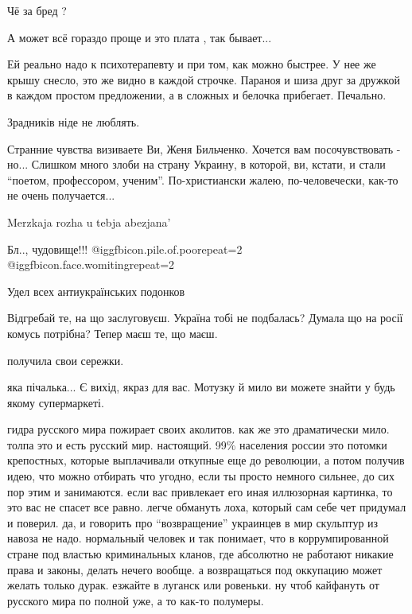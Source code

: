 \begin{itemize}
Чё за бред ?

А может всё гораздо проще и это плата , так бывает...

Ей реально надо к психотерапевту и при том, как можно быстрее. У нее же крышу снесло, это же видно в каждой строчке. Параноя и шиза друг за дружкой в каждом простом предложении, а в сложных и белочка прибегает. Печально.

Зрадників ніде не люблять.


Странние чувства визиваете Ви, Женя Бильченко. Хочется вам посочувствовать -
но... Слишком много злоби на страну Украину, в которой, ви, кстати, и стали
\enquote{поетом, профессором, ученим}. По-христиански жалею, по-человечески, как-то не
очень получается...

Merzkaja rozha u tebja abezjana'

Бл.., чудовище!!! @igg{fbicon.pile.of.poo}{repeat=2}  @igg{fbicon.face.womiting}{repeat=2} 

Удел всех антиукраїнських подонков

Відгребай те, на що заслуговуєш. Україна тобі не подбалась? Думала що на росії
комусь потрібна? Тепер маєш те, що маєш.

получила свои сережки.

яка пічалька...
Є вихід, якраз для вас.
Мотузку й мило ви можете знайти у будь якому супермаркеті.


гидра русского мира пожирает своих аколитов. как же это драматически мило.
толпа это и есть русский мир. настоящий. 99\% населения россии это потомки
крепостных, которые выплачивали откупные еще до революции, а потом получив
идею, что можно отбирать что угодно, если ты просто немного сильнее, до сих пор
этим и занимаются. если вас привлекает его иная иллюзорная картинка, то это вас
не спасет все равно. легче обмануть лоха, который сам себе чет придумал и
поверил. да, и говорить про \enquote{возвращение} украинцев в мир скульптур из навоза
не надо. нормальный человек и так понимает, что в коррумпированной стране под
властью криминальных кланов, где абсолютно не работают никакие права и законы,
делать нечего вообще. а возвращаться под оккупацию может желать только дурак.
езжайте в луганск или ровеньки. ну чтоб кайфануть от русского мира по полной
уже, а то как-то полумеры.



\end{itemize}
